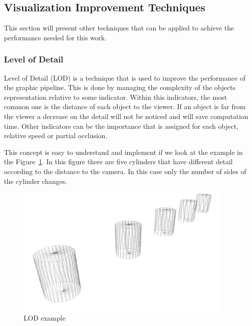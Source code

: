 

\subsection{Visualization Improvement Techniques} %
\label{sub:other_techniques}

This section will present other techniques that can be applied to achieve the performance needed for this work.

\subsubsection{Level of Detail} %
\label{ssub:level_of_detail}

Level of Detail (LOD) is a technique that is used to improve the performance of the graphic pipeline. This is done by managing the complexity of the objects representation relative to some indicator.
Within this indicators, the most common one is the distance of each object to the viewer. If an object is far from the viewer a decrease on the detail will not be noticed and will save computation time. Other indicators can be the importance that is assigned for each object, relative speed or partial occlusion.

This concept is easy to understand and implement if we look at the example in the Figure~\ref{fig:LOD2}. In this figure there are five cylinders that have different detail according to the distance to the camera. In this case only the number of sides of the cylinder changes.

\begin{figure}[htbp]
	\centering
	\includegraphics[width=0.95\textwidth]{img/OpenGL/LOD3.png}
	\caption{LOD example}
	\label{fig:LOD2}
\end{figure}

